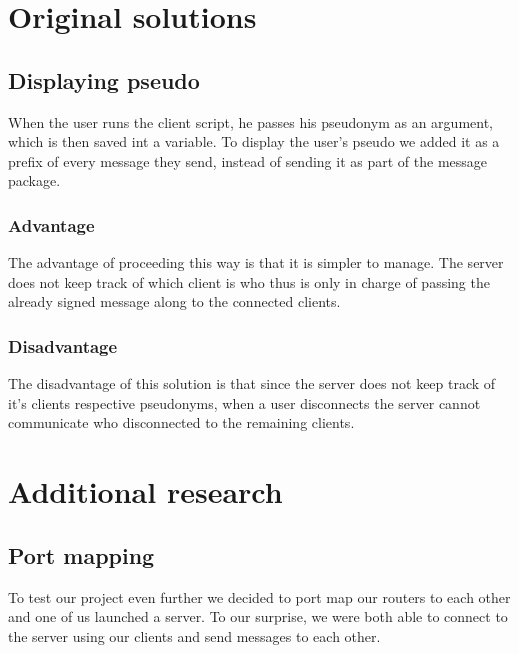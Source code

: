 \documentclass{article}
\begin{document}
\section{Original solutions}

\subsection{Displaying pseudo}
When the user runs the client script, he passes his pseudonym as an argument, which is then saved int a variable. To display the user's pseudo we added it as a prefix of every message they send, instead of sending it as part of the message package. 

\subsubsection{Advantage}
The advantage of proceeding this way is that it is simpler to manage. The server does not keep track of which client is who thus is only in charge of passing the already signed message along to the connected clients.
\subsubsection{Disadvantage}
The disadvantage of this solution is that since the server does not keep track of it's clients respective pseudonyms, when a user disconnects the server cannot communicate who disconnected to the remaining clients.

\section{Additional research}

\subsection{Port mapping}
To test our project even further we decided to port map our routers to each other and one of us launched a server. To our surprise, we were both able to connect to the server using our clients and send messages to each other.
\end{document}
